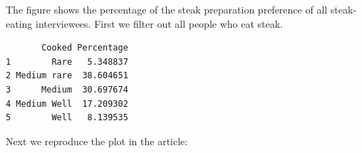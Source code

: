 \documentclass[
  letterpaper,
  DIV=11,
  numbers=noendperiod]{scrartcl}
\newenvironment{Shaded}{\begin{snugshade}}{\end{snugshade}}
\newcommand{\CommentTok}[1]{\textcolor[rgb]{0.37,0.37,0.37}{#1}}
\newcommand{\DecValTok}[1]{\textcolor[rgb]{0.68,0.00,0.00}{#1}}
\newcommand{\FloatTok}[1]{\textcolor[rgb]{0.68,0.00,0.00}{#1}}
\newcommand{\FunctionTok}[1]{\textcolor[rgb]{0.28,0.35,0.67}{#1}}
\newcommand{\NormalTok}[1]{\textcolor[rgb]{0.00,0.23,0.31}{#1}}
\newcommand{\OtherTok}[1]{\textcolor[rgb]{0.00,0.23,0.31}{#1}}
\newcommand{\SpecialCharTok}[1]{\textcolor[rgb]{0.37,0.37,0.37}{#1}}
\newcommand{\StringTok}[1]{\textcolor[rgb]{0.13,0.47,0.30}{#1}}
\begin{document}
The figure shows the percentage of the steak preparation preference of
all steak-eating interviewees. First we filter out all people who eat
steak.

\begin{Shaded}
\end{Shaded}

\begin{verbatim}
       Cooked Percentage
1        Rare   5.348837
2 Medium rare  38.604651
3      Medium  30.697674
4 Medium Well  17.209302
5        Well   8.139535
\end{verbatim}

Next we reproduce the plot in the article:
\end{document}
